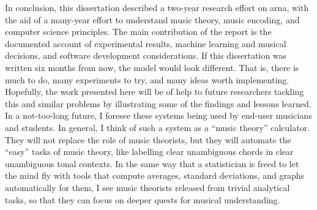 
In conclusion, this dissertation described a two-year
research effort on \gls{arna}, with the aid of a many-year
effort to understand music theory, music encoding, and
computer science principles. The main contribution of the
report is the documented account of experimental results,
machine learning and musical decisions, and software
development considerations. If this dissertation was written
six months from now, the model would look different. That
is, there is much to do, many experiments to try, and many
ideas worth implementing. Hopefully, the work presented here
will be of help to future researchers tackling this and
similar problems by illustrating some of the findings and
lessons learned. In a not-too-long future, I foresee these
systems being used by end-user musicians and students. In
general, I think of such a system as a ``music theory''
calculator. They will not replace the role of music
theorists, but they will automate the ``easy'' tasks of
music theory, like labelling clear unambiguous chords in
clear unambiguous tonal contexts. In the same way that a
statistician is freed to let the mind fly with tools that
compute averages, standard deviations, and graphs
automatically for them, I see music theorists released from
trivial analytical tasks, so that they can focus on deeper
quests for musical understanding.
